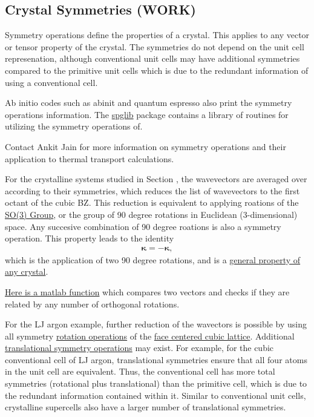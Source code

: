 \subsection{\label{A:symmetry}Crystal Symmetries (WORK)}

Symmetry operations define the properties of a crystal. 
This applies to any vector or tensor property of the crystal. The 
symmetries do not depend on the unit cell represenation, although 
conventional unit cells may have additional symmetries compared 
to the primitive unit cells which is due to the redundant information of 
using a conventional cell. 

Ab initio codes such as abinit and quantum espresso also print the 
symmetry operations information. The 
\href{http://spglib.sourceforge.net/}{spglib} 
package contains a library of routines for utilizing the 
symmetry operations of.

Contact Ankit Jain for more information on symmetry operations 
and their application to thermal transport calculations. 

For the crystalline systems studied in Section , the wavevectors 
are averaged over according to their symmetries, 
which reduces the list of wavevectors to the first octant of the 
cubic BZ.\cite{mcgaughey_phonon_2004} This reduction is equivalent 
to applying roations of the 
\href{http://en.wikipedia.org/wiki/Rotation_group_SO(3)}
{SO(3) Group}, or the group of 90 degree rotations in Euclidean 
(3-dimensional) space. 
Any succesive combination of 90 degree roations is also a symmetry 
operation. This property leads to the identity
\begin{equation}\label{EQ:kpt_sym}
 \begin{split}
  \pmb{\kappa} = -\pmb{\kappa},
 \end{split}
\end{equation}
which is the application of two 90 degree rotations, and is a 
\href{http://en.wikipedia.org/wiki/Parity_(physics)#Odd}
{general property of any crystal}. 

\href{https://github.com/jasonlarkin/disorder/blob/master/matlab/issym.m}
{Here is a matlab function} which compares two vectors 
and checks if they are related by any number of orthogonal 
rotations.

For the LJ argon example, further reduction  of the wavectors is 
possible by using all symmetry 
\href{http://spglib.sourceforge.net/#rotation}{rotation operations} 
of the 
\href{http://www.wolframalpha.com/input/?i=face-centered+cubic}
{face centered cubic lattice}. Additional 
\href{http://en.wikipedia.org/wiki/Translational_symmetry}
{translational symmetry operations} may exist. 
For example, for the cubic conventional cell of LJ argon, translational 
symmetries ensure that all four atoms in the unit cell are 
equivalent. Thus, the conventional cell has more total 
symmetries (rotational plus translational) than the primitive cell, 
which is due to the redundant information contained within it. Similar 
to conventional unit cells, crystalline supercells also have a larger 
number of translational symmetries.

